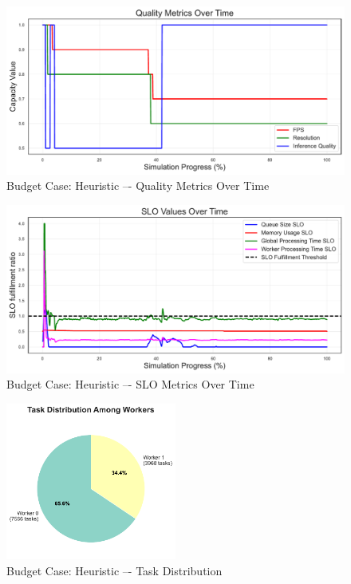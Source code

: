 \begin{figure}[h]
    \centering
    \includegraphics[width=\textwidth]{img/results/variable_computational_budget/heuristic_quality_metrics.pdf}
    \caption{Budget Case: Heuristic –- Quality Metrics Over Time}
\end{figure}
\begin{figure}[h]
    \centering
    \includegraphics[width=\textwidth]{img/results/variable_computational_budget/heuristic_slo_values.pdf}
    \caption{Budget Case: Heuristic –- SLO Metrics Over Time}
\end{figure}
\begin{figure}[h]
    \centering
    \includegraphics[width=0.5\textwidth]{img/results/variable_computational_budget/heuristic_task_distribution_pie.pdf}
    \caption{Budget Case: Heuristic –- Task Distribution}
\end{figure}

